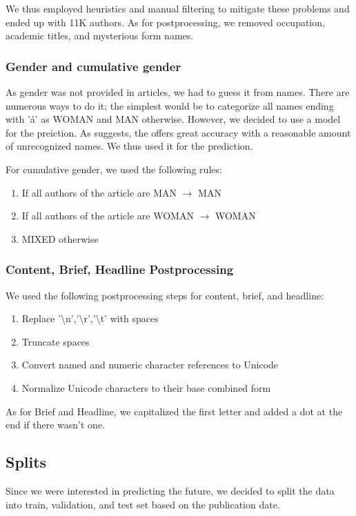 We thus employed heuristics and manual filtering
to mitigate these problems and ended up with 11K authors.
As for postprocessing, we removed occupation, academic titles, and mysterious form names.

\subsubsection{Gender and cumulative gender}
\label{sec:gender}
As gender was not provided in articles, we had to guess it from names.
There are numerous ways to do it; the simplest would be to categorize all names ending with 'á' as WOMAN and MAN otherwise.
However, we decided to use a model for the preiction.
As \cite{seboPerformanceGenderDetection} suggests,
the \cite{NamsorNameChecker} offers great accuracy with a reasonable amount of unrecognized names.
We thus used it for the prediction.

For cumulative gender, we used the following rules:
\begin{enumerate}
    \item If all authors of the article are MAN $\rightarrow$ MAN
    \item If all authors of the article are WOMAN $\rightarrow$ WOMAN
    \item MIXED otherwise
\end{enumerate}

\subsubsection{Content, Brief, Headline Postprocessing}
We used the following postprocessing steps for content, brief, and headline:
\begin{enumerate}
    \item Replace '\textbackslash{n}','\textbackslash{r}','\textbackslash{t}' with spaces
    \item Truncate spaces
    \item Convert named and numeric character references to Unicode
    \item Normalize Unicode characters to their base combined form
\end{enumerate}
As for Brief and Headline, we capitalized the first letter
and added a dot at the end if there wasn't one.

\subsection{Splits}
Since we were interested in predicting the future,
we decided to split the data into train, validation, and test set based on the publication date.

